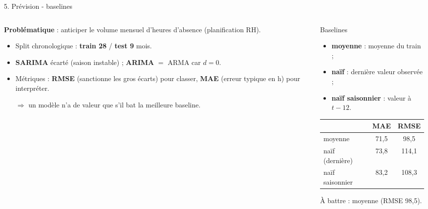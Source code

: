 \documentclass[10pt,aspectratio=169]{beamer}
\begin{document}
\begin{frame}{5. Prévision - baselines}
\begin{columns}[c]
\begin{column}{0.52\textwidth}\small
\textbf{Problématique} : anticiper le volume mensuel d'heures d'absence (planification RH).
\begin{itemize}
  \item Split chronologique : \textbf{train 28} / \textbf{test 9} mois.
  \item \textbf{SARIMA} écarté (saison instable) ; \textbf{ARIMA} $=$ ARMA car $d=0$.
  \item Métriques : \textbf{RMSE} (sanctionne les gros écarts) pour classer, \textbf{MAE} (erreur typique en h) pour interpréter.
  \item[$\Rightarrow$] un modèle n'a de valeur que s'il \alert{bat la meilleure baseline}.
\end{itemize}
\end{column}
\begin{column}{0.48\textwidth}
\begin{block}{Baselines}\small
\begin{itemize}
  \item \textbf{moyenne} : moyenne du train ;
  \item \textbf{naïf} : dernière valeur observée ;
  \item \textbf{naïf saisonnier} : valeur à $t-12$.
\end{itemize}
\end{block}
\begin{center}\scriptsize
\begin{tabular}{lcc}
\toprule & MAE & RMSE \\ \midrule
\alert{moyenne} & 71,5 & \alert{98,5} \\
naïf (dernière) & 73,8 & 114,1 \\
naïf saisonnier & 83,2 & 108,3 \\ \bottomrule
\end{tabular}
\end{center}
\centering\small À battre : \alert{moyenne (RMSE 98,5)}.
\end{column}
\end{columns}
\end{frame}
\end{document}
